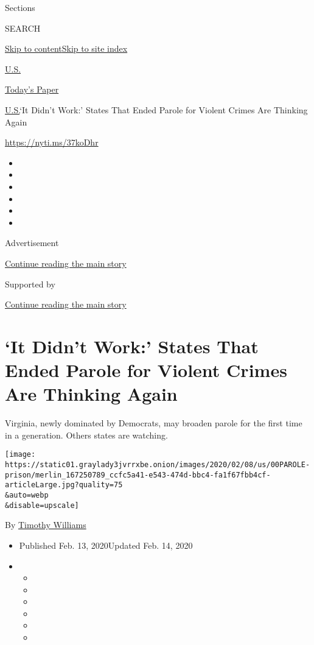Sections

SEARCH

\protect\hyperlink{site-content}{Skip to
content}\protect\hyperlink{site-index}{Skip to site index}

\href{https://www.nytimes3xbfgragh.onion/section/us}{U.S.}

\href{https://myaccount.nytimes3xbfgragh.onion/auth/login?response_type=cookie\&client_id=vi}{}

\href{https://www.nytimes3xbfgragh.onion/section/todayspaper}{Today's
Paper}

\href{/section/us}{U.S.}\textbar{}`It Didn't Work:' States That Ended
Parole for Violent Crimes Are Thinking Again

\url{https://nyti.ms/37koDhr}

\begin{itemize}
\item
\item
\item
\item
\item
\item
\end{itemize}

Advertisement

\protect\hyperlink{after-top}{Continue reading the main story}

Supported by

\protect\hyperlink{after-sponsor}{Continue reading the main story}

\hypertarget{it-didnt-work-states-that-ended-parole-for-violent-crimes-are-thinking-again}{%
\section{`It Didn't Work:' States That Ended Parole for Violent Crimes
Are Thinking
Again}\label{it-didnt-work-states-that-ended-parole-for-violent-crimes-are-thinking-again}}

Virginia, newly dominated by Democrats, may broaden parole for the first
time in a generation. Others states are watching.

\texttt{[image: https://static01.graylady3jvrrxbe.onion/images/2020/02/08/us/00PAROLE-prison/merlin\_167250789\_ccfc5a41-e543-474d-bbc4-fa1f67fbb4cf-articleLarge.jpg?quality=75\\\&auto=webp\\\&disable=upscale]}

By \href{https://www.nytimes3xbfgragh.onion/by/timothy-williams}{Timothy
Williams}

\begin{itemize}
\item
  Published Feb. 13, 2020Updated Feb. 14, 2020
\item
  \begin{itemize}
  \item
  \item
  \item
  \item
  \item
  \item
  \end{itemize}
\end{itemize}

